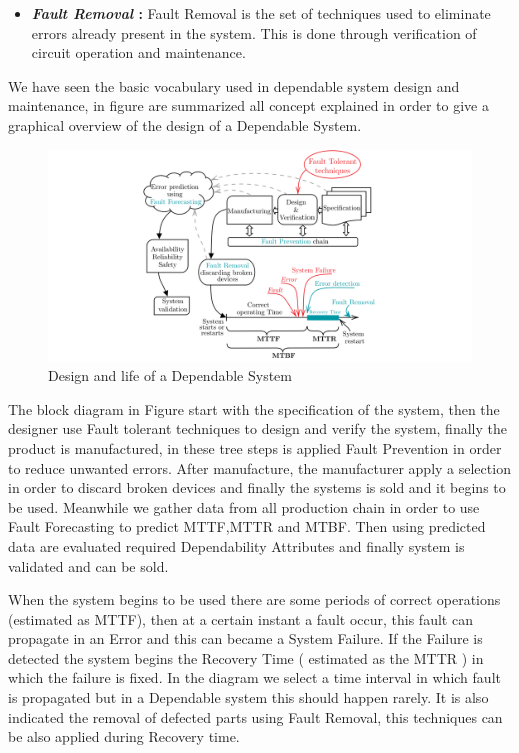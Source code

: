 {{{{\begin{itemize}
					\item \textbf{\textit{Fault Removal} : } Fault Removal is the set of techniques used to eliminate errors already present in the system. This is done through verification of circuit operation and maintenance.
				\end{itemize}     	
			} %
			We have seen the basic vocabulary used in dependable system design and maintenance, in figure  are summarized all concept explained in order to give a graphical overview of the design of a Dependable System.  
			\begin{figure}[H]
				\centering
				\includegraphics[scale=0.26,center]{./images/Dependability1.png}
				\caption{Design and life of a Dependable System}
				\label{fig:dependability1}
			\end{figure} 
			The block diagram in Figure  start with the specification of the system, then the designer use Fault tolerant techniques to design and verify the system, finally the product is manufactured, in these tree steps is applied Fault Prevention in order to reduce unwanted errors. After manufacture, the manufacturer apply a selection in order to discard broken devices and finally the systems is sold and it begins to be used. Meanwhile we gather data from all production chain in order to use Fault Forecasting to predict MTTF,MTTR and MTBF. Then using predicted data are evaluated required Dependability Attributes and finally system is validated and can be sold.
			
			When the system begins to be used there are some periods of correct operations (estimated as MTTF), then at a certain instant a fault occur, this fault can propagate in an Error and this can became a System Failure. If the Failure is detected the system begins the Recovery Time ( estimated as the MTTR ) in which the failure is fixed. In the diagram we select a time interval in which fault is propagated but in a Dependable system this should happen rarely. It is also indicated the removal of defected parts using Fault Removal, this techniques can be also applied during Recovery time.  
			     
}}}
